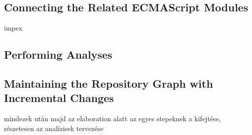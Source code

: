 \subsection{Connecting the Related ECMAScript Modules}

impex


\subsection{Performing Analyses}


\subsection{Maintaining the Repository Graph with Incremental Changes}

mindezek után majd az elaboration alatt az egyes stepeknek a kifejtése, részetesen az analízisek tervezése